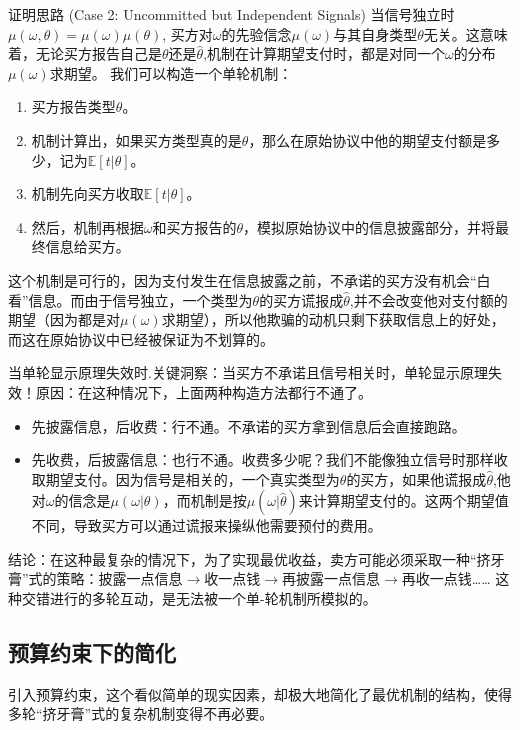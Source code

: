 证明思路 (Case 2: Uncommitted but Independent Signals)
当信号独立时$\mu(\omega,\theta)=\mu(\omega)\mu(\theta)$, 买方对$\omega$的先验信念$\mu(\omega)$与其自身类型$\theta$无关。这意味着，无论买方报告自己是$\theta$还是$\hat{\theta}$,机制在计算期望支付时，都是对同一个$\omega$的分布$\mu(\omega)$求期望。
我们可以构造一个单轮机制：
\begin{enumerate}
    \item 买方报告类型$\theta$。
    \item 机制计算出，如果买方类型真的是$\theta$，那么在原始协议中他的期望支付额是多少，记为$\mathbb{E}[t|\theta]$。
    \item 机制先向买方收取$\mathbb{E}[t|\theta]$。
    \item 然后，机制再根据$\omega$和买方报告的$\theta$，模拟原始协议中的信息披露部分，并将最终信息给买方。
\end{enumerate}

这个机制是可行的，因为支付发生在信息披露之前，不承诺的买方没有机会“白看”信息。而由于信号独立，一个类型为$\theta$的买方谎报成$\hat{\theta}$,并不会改变他对支付额的期望（因为都是对$\mu(\omega)$求期望），所以他欺骗的动机只剩下获取信息上的好处，而这在原始协议中已经被保证为不划算的。

当单轮显示原理失效时.关键洞察：当买方不承诺且信号相关时，单轮显示原理失效！原因：在这种情况下，上面两种构造方法都行不通了。
\begin{itemize}
    \item 先披露信息，后收费：行不通。不承诺的买方拿到信息后会直接跑路。
    \item 先收费，后披露信息：也行不通。收费多少呢？我们不能像独立信号时那样收取期望支付。因为信号是相关的，一个真实类型为$\theta$的买方，如果他谎报成$\hat{\theta}$,他对$\omega$的信念是$\mu(\omega|\theta)$，而机制是按$\mu(\omega|\hat{\theta})$来计算期望支付的。这两个期望值不同，导致买方可以通过谎报来操纵他需要预付的费用。
\end{itemize}

结论：在这种最复杂的情况下，为了实现最优收益，卖方可能必须采取一种“挤牙膏”式的策略：披露一点信息$\to$收一点钱$\to$再披露一点信息$\to$再收一点钱…… 这种交错进行的多轮互动，是无法被一个单-轮机制所模拟的。

\subsection{预算约束下的简化}

引入预算约束，这个看似简单的现实因素，却极大地简化了最优机制的结构，使得多轮“挤牙膏”式的复杂机制变得不再必要。

